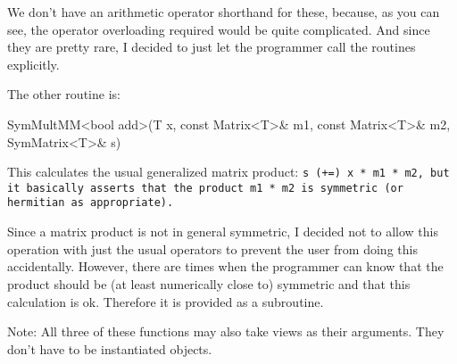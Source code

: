 We don't have an arithmetic operator 
shorthand for these, because, as you can see, the operator
overloading required would be quite complicated.  
And since they are pretty rare, I decided to just let the programmer 
call the routines explicitly.

The other routine is:
\begin{tmvcode}
SymMultMM<bool add>(T x, const Matrix<T>& m1, const Matrix<T>& m2, 
      SymMatrix<T>& s)
\end{tmvcode}
This calculates the usual generalized matrix product:
\tt{s (+=) x * m1 * m2}, but it basically
asserts that the product \tt{m1 * m2} is symmetric (or hermitian as appropriate).

Since a matrix product is not in general symmetric, I decided not to allow 
this operation with just the usual operators to prevent the user from doing 
this accidentally.  However, there are times when the 
programmer can know that the product should be (at least numerically close to)
symmetric and that this calculation is ok.  Therefore it is provided as a subroutine.

Note: All three of these functions may also take views as their arguments.  They don't have to be instantiated objects.

